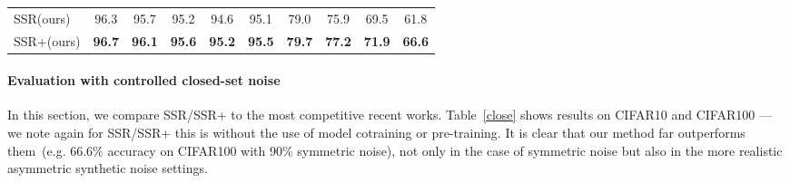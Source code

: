 \documentclass{bmvc2k}
\begin{document}
\begin{table*}[htbp]
\begin{center}
{\begin{tabular}{@{}l|ccccc|cccc@{}}
SSR(ours)                                    & \multicolumn{1}{c|}{96.3}          & \multicolumn{1}{c|}{95.7}          & \multicolumn{1}{c|}{95.2}          & \multicolumn{1}{c|}{94.6}          & 95.1          & \multicolumn{1}{c|}{79.0}              & \multicolumn{1}{c|}{75.9}              & \multicolumn{1}{c|}{69.5}              &  61.8             \\
SSR+(ours)                                   & \multicolumn{1}{c|}{\textbf{96.7}} & \multicolumn{1}{c|}{\textbf{96.1}} & \multicolumn{1}{c|}{\textbf{95.6}} & \multicolumn{1}{c|}{\textbf{95.2}} & \textbf{95.5} & \multicolumn{1}{c|}{\textbf{79.7}} & \multicolumn{1}{c|}{\textbf{77.2}} & \multicolumn{1}{c|}{\textbf{71.9}} & \textbf{66.6} \\ \bottomrule
\end{tabular}
}
\end{center}
\caption{Evaluation on CIFAR-10 and CIFAR-100 with closed-set noise. Methods marked with an asterisk employ semi-supervised learning, model co-training or model pre-training.}
\label{close}
\end{table*}

\paragraph{Evaluation with controlled closed-set noise}
In this section, we compare SSR/SSR+ to the most competitive recent works. Table~\ref{close} shows results on CIFAR10 and CIFAR100 --- we note again for SSR/SSR+ this is without the use of model cotraining or pre-training. It is clear that our method far outperforms them~(e.g. 66.6\% accuracy on CIFAR100 with 90\% symmetric noise), not only in the case of symmetric noise but also in the more realistic asymmetric synthetic noise settings.

\begin{table*}[t]
\begin{center}
\end{center}
\caption{Testing accuracy~(\%) on Clothing1M (methods with * utilized model cotraining).}
\label{clothing1m}
\end{table*}
\end{document}
